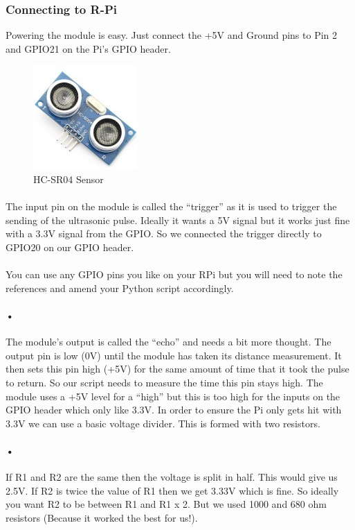 \documentclass[a4paper,12pt,oneside]{book}
\begin{document}
\subsubsection{Connecting to R-Pi}
			Powering the module is easy. Just connect the +5V and Ground pins to Pin 2 and GPIO21 on the Pi’s GPIO header.
			\begin{figure}[h]
				\centering
				\includegraphics[scale=0.75]{sensor}
				\caption{HC-SR04 Sensor}
			\end{figure}

\paragraph{}The input pin on the module is called the “trigger” as it is used to trigger the sending of the ultrasonic pulse. Ideally it wants a 5V signal but it works just fine with a 3.3V signal from the GPIO. So we connected the trigger directly to GPIO20 on our GPIO header.
\paragraph{}
You can use any GPIO pins you like on your RPi but you will need to note the references and amend your Python script accordingly.
\paragraph{•}
The module’s output is called the “echo” and needs a bit more thought. The output pin is low (0V) until the module has taken its distance measurement. It then sets this pin high (+5V) for the same amount of time that it took the pulse to return. So our script needs to measure the time this pin stays high. The module uses a +5V level for a “high” but this is too high for the inputs on the GPIO header which only like 3.3V. In order to ensure the Pi only gets hit with 3.3V we can use a basic voltage divider. This is formed with two resistors.
\paragraph{•}
If R1 and R2 are the same then the voltage is split in half. This would give us 2.5V. If R2 is twice the value of R1 then we get 3.33V which is fine. So ideally you want R2 to be between R1 and R1 x 2. But we used 1000 and 680 ohm resistors (Because it worked the best for us!).
\end{document}
